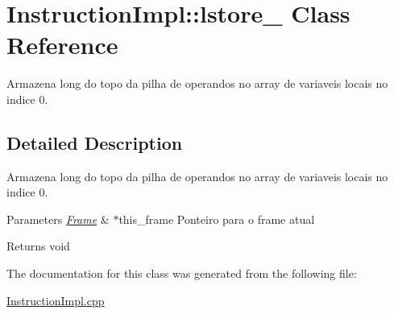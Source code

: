 \hypertarget{class_instruction_impl_1_1lstore__0}{}\section{Instruction\+Impl\+:\+:lstore\+\_ Class Reference}
\label{class_instruction_impl_1_1lstore__0}


Armazena long do topo da pilha de operandos no array de variaveis locais no indice 0.  




\subsection{Detailed Description}
Armazena long do topo da pilha de operandos no array de variaveis locais no indice 0. 


\begin{DoxyParams}{Parameters}
{\em \hyperlink{struct_frame}{Frame}} & $\ast$this\+\_\+frame Ponteiro para o frame atual \\
\hline
\end{DoxyParams}
\begin{DoxyReturn}{Returns}
void 
\end{DoxyReturn}


The documentation for this class was generated from the following file\+:\begin{DoxyCompactItemize}
\item 
\hyperlink{_instruction_impl_8cpp}{Instruction\+Impl.\+cpp}\end{DoxyCompactItemize}
